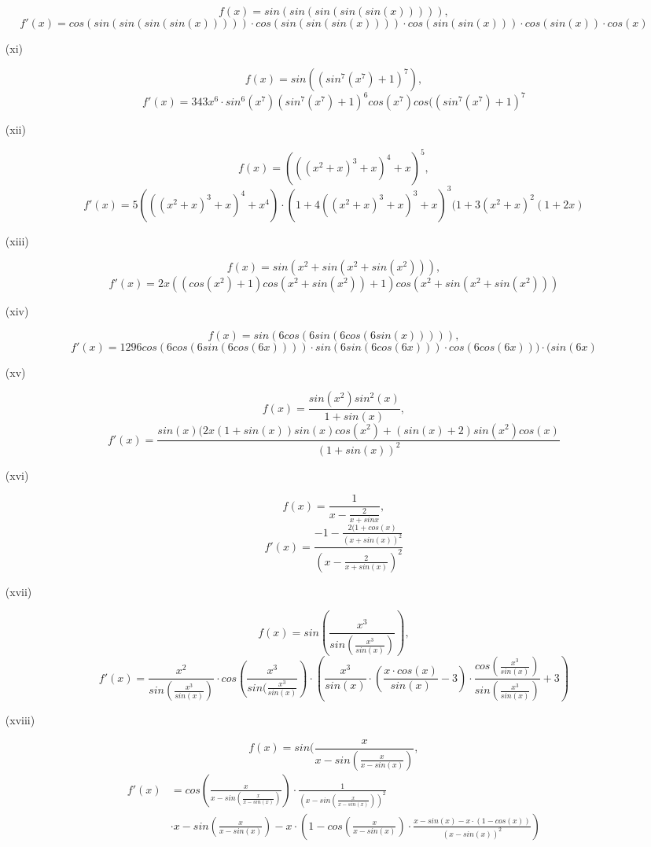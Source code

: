 \documentclass[a4paper,12pt]{report}
\begin{document}
\begin{enumerate}
\begin{sloppypar}
\[f(x)=sin(sin(sin(sin(sin(x))))),\] \[f'(x)=cos(sin(sin(sin(sin(x)))))\cdot{cos(sin(sin(sin(x))))\cdot{cos(sin(sin(x)))\cdot{cos(sin(x))}\cdot{cos(x)}}}\]
\end{sloppypar}
\item[(xi)] 
\begin{sloppypar}
\[f(x)=sin((sin^7(x^7)+1)^7),\] \[ f'(x)=343x^6\cdot{sin^6(x^7)(sin^7(x^7)+1)^6cos(x^7)cos((sin^7(x^7)+1)^7}\]
\end{sloppypar}
\item[(xii)]
\begin{sloppypar}
\[f(x)=(((x^2+x)^3+x)^4+x)^5,\]
\[ f'(x)=5(((x^2+x)^3+x)^4+x^4)\cdot{(1+4((x^2+x)^3+x)^3+x)^3(1+3(x^2+x)^2(1+2x)}\]
\end{sloppypar} 
\item[(xiii)] 
\begin{sloppypar}
\[f(x)=sin(x^2+sin(x^2+sin(x^2))),\]
\[ f'(x)=2x((cos(x^2)+1)cos(x^2+sin(x^2))+1)cos(x^2+sin(x^2+sin(x^2)))\]
\end{sloppypar} 
\item[(xiv)] 
\begin{sloppypar}
\[f(x)=sin(6cos(6sin(6cos(6sin(x))))),\]
\[ f'(x)=1296cos(6cos(6sin(6cos(6x))))\cdot{sin(6sin(6cos(6x)))\cdot{cos(6cos(6x)))\cdot{(sin(6x)}}}\]
\end{sloppypar}
\item[(xv)] 
\begin{sloppypar}
\[f(x)=\frac{sin(x^2)sin^2(x)}{1+sin(x)},\]
\[ f'(x)=\frac{sin(x)(2x(1+sin(x))sin(x)cos(x^2)+(sin(x)+2)sin(x^2)cos(x)}{(1+sin(x))^2}\]
\end{sloppypar}
\item[(xvi)] 
\begin{sloppypar}
\[f(x)=\frac{1}{x-\frac{2}{x+sinx}},\]
\[ f'(x)=\frac{-1-\frac{2(1+cos(x)}{(x+sin(x))^2}}{(x-\frac{2}{x+sin(x)})^2}\]
\end{sloppypar}
\item[(xvii)] \begin{sloppypar}
\[f(x)=sin(\frac{x^3}{sin(\frac{x^3}{sin(x)})}),\]
\[ f'(x)=\frac{x^2}{sin(\frac{x^3}{sin(x)})}\cdot{cos(\frac{x^3}{sin(\frac{x^3}{sin(x)}})}\cdot{(\frac{x^3}{sin(x)}\cdot{(\frac{x\cdot{cos(x)}}{sin(x)}-3)}\cdot{\frac{cos(\frac{x^3}{sin(x)})}{sin(\frac{x^3}{sin(x)})}}+3)}\]
\end{sloppypar}
\item[(xviii)] 
\begin{sloppypar}
\[f(x)=sin(\frac{x}{x-sin(\frac{x}{x-sin(x)})},\]
\begin{align*}
f'(x)&=cos(\frac{x}{x-sin(\frac{x}{x-sin(x)})})\cdot{\frac{1}{(x-sin(\frac{x}{x-sin(x)}))^2}}\\&\cdot{x-sin(\frac{x}{x-sin(x)})-x\cdot{(1-cos(\frac{x}{x-sin(x)})\cdot{\frac{x-sin(x)-x\cdot{(1-cos(x))}}{(x-sin(x))^2}})}}
\end{align*}
\end{sloppypar}
\end{enumerate}
\end{document}
